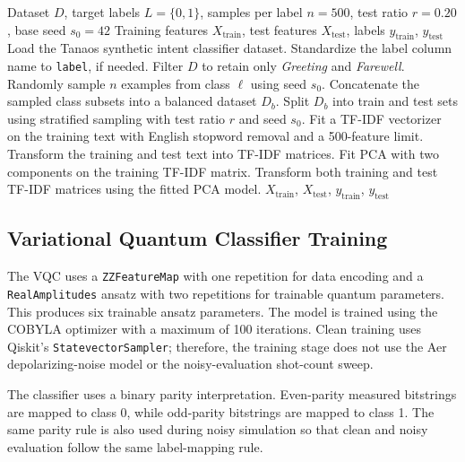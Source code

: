 \documentclass[conference]{IEEEtran}
\begin{document}
\begin{algorithm}[H]
\caption{Dataset Preparation and Feature Extraction}
\label{alg:data_features}
\begin{algorithmic}[1]
\Require Dataset $D$, target labels $L=\{0,1\}$, samples per label $n=500$, test ratio $r=0.20$, base seed $s_0=42$
\Ensure Training features $X_{\mathrm{train}}$, test features $X_{\mathrm{test}}$, labels $y_{\mathrm{train}}$, $y_{\mathrm{test}}$
\State Load the Tanaos synthetic intent classifier dataset.
\State Standardize the label column name to \texttt{label}, if needed.
\State Filter $D$ to retain only \textit{Greeting} and \textit{Farewell}.
    \State Randomly sample $n$ examples from class $\ell$ using seed $s_0$.
\EndFor
\State Concatenate the sampled class subsets into a balanced dataset $D_b$.
\State Split $D_b$ into train and test sets using stratified sampling with test ratio $r$ and seed $s_0$.
\State Fit a TF-IDF vectorizer on the training text with English stopword removal and a 500-feature limit.
\State Transform the training and test text into TF-IDF matrices.
\State Fit PCA with two components on the training TF-IDF matrix.
\State Transform both training and test TF-IDF matrices using the fitted PCA model.
\State \Return $X_{\mathrm{train}}$, $X_{\mathrm{test}}$, $y_{\mathrm{train}}$, $y_{\mathrm{test}}$
\end{algorithmic}
\end{algorithm}

\subsection{Variational Quantum Classifier Training}

The VQC uses a \texttt{ZZFeatureMap} with one repetition for data encoding and a
\texttt{RealAmplitudes} ansatz with two repetitions for trainable quantum
parameters. This produces six trainable ansatz parameters. The model is trained
using the COBYLA optimizer with a maximum of 100 iterations. Clean training uses Qiskit's 
\texttt{StatevectorSampler}; therefore, the training stage does not
use the Aer depolarizing-noise model or the noisy-evaluation shot-count sweep.

The classifier uses a binary parity interpretation. Even-parity measured
bitstrings are mapped to class 0, while odd-parity bitstrings are mapped to class
1. The same parity rule is also used during noisy simulation so that clean and
noisy evaluation follow the same label-mapping rule.
\end{document}
